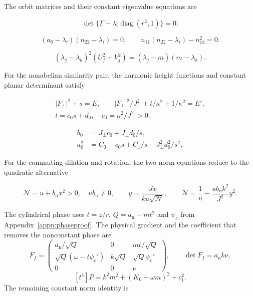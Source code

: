 The orbit matrices and their constant eigenvalue equations are

\begin{equation}\label{supp:fnd:orbitlambda}
\det\{\Gamma-\lambda_i\operatorname{diag}(r^2,1)\}=0.
\end{equation}

\begin{equation}\label{supp:fnd:orbitcoeffs}
(a_0-\lambda_i)(n_{22}-\lambda_i)=0,\qquad
n_{11}(n_{22}-\lambda_i)-n_{12}^2=0.
\end{equation}

\begin{equation}\label{supp:fnd:twoplaneidentity}
(\lambda_j-\lambda_k)^2(U_j^2+V_j^2)
=(\lambda_j-m)(m-\lambda_k).
\end{equation}

For the nonabelian similarity pair, the harmonic height functions
and constant planar determinant satisfy

\begin{equation}\label{supp:fnd:nonabelianenergy}
\begin{gathered}
|F_\perp|^2+s=E,\qquad |F_\perp|^2/J_\perp^2+t/\kappa^2+1/\kappa^2=E',\\
t=c_0s+d_0,\quad c_0=\kappa^2/J_\perp^2>0.
\end{gathered}
\end{equation}

\begin{align}
b_0&=J_\perp c_0+J_\perp d_0/s,\label{supp:fnd:harmonicb}\\
a_0^2&=C_0-c_0s+C_1/s-J_\perp^2d_0^2/s^2,\label{supp:fnd:harmonicP}
\end{align}

For the commuting dilation and rotation, the two norm equations
reduce to the quadratic alternative

\begin{equation}\label{supp:fnd:quadraticnorm}
\mathcal N=u+b_{\mathrm n}x^2>0,\quad ub_{\mathrm n}\ne0,\qquad
y=\frac{Jx}{ku\sqrt{\mathcal N}},\qquad
\widetilde{\mathcal N}=\frac1u-\frac{ub_{\mathrm n}k^2}{J^2}y^2.
\end{equation}

The cylindrical phase uses $t=z/r$,
$Q=a_{\mathrm n}+mt^2$ and $\psi_c$ from
Appendix~\ref{appn:phaseproof}. The physical gradient and the
coefficient that removes the nonconstant phase are
\[
 F_f=\begin{pmatrix}
 a_{\mathrm n}/\sqrt Q&0&mt/\sqrt Q\\
 \sqrt Q(\omega-t\psi_c')&k\sqrt Q&\sqrt Q\psi_c'\\
 0&0&\nu
 \end{pmatrix},\qquad \det F_f=a_{\mathrm n}k\nu,
\]
\[
 [t^4]P=k^2m^2+(K_0-\omega m)^2+c_1^2.
\]
The remaining constant norm identity is

